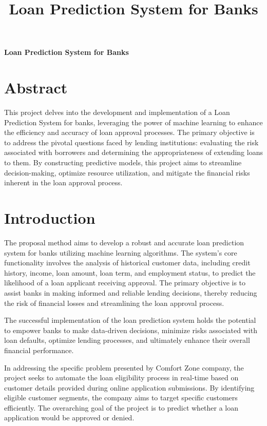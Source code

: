 \documentclass[10pt]{article}
\begin{document}
\vspace{1cm}

\begin{center}
    {\Large {\bf Loan Prediction System for Banks}} \\ 
\end{center}
\title{Loan Prediction System for Banks}


\section*{Abstract}

This project delves into the development and implementation of a Loan Prediction System for banks, leveraging the power of machine learning to enhance the efficiency and accuracy of loan approval processes. The primary objective is to address the pivotal questions faced by lending institutions: evaluating the risk associated with borrowers and determining the appropriateness of extending loans to them. By constructing predictive models, this project aims to streamline decision-making, optimize resource utilization, and mitigate the financial risks inherent in the loan approval process.

\section*{Introduction}

The proposal method aims to develop a robust and accurate loan prediction system for banks utilizing machine learning algorithms. The system's core functionality involves the analysis of historical customer data, including credit history, income, loan amount, loan term, and employment status, to predict the likelihood of a loan applicant receiving approval. The primary objective is to assist banks in making informed and reliable lending decisions, thereby reducing the risk of financial losses and streamlining the loan approval process.

The successful implementation of the loan prediction system holds the potential to empower banks to make data-driven decisions, minimize risks associated with loan defaults, optimize lending processes, and ultimately enhance their overall financial performance.

In addressing the specific problem presented by Comfort Zone company, the project seeks to automate the loan eligibility process in real-time based on customer details provided during online application submissions. By identifying eligible customer segments, the company aims to target specific customers efficiently. The overarching goal of the project is to predict whether a loan application would be approved or denied.
\end{document}

